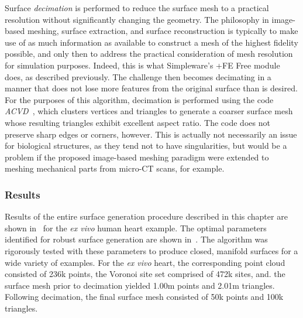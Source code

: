 Surface \textit{decimation} is performed to reduce the surface mesh to a practical resolution without significantly changing the geometry. The philosophy in image-based meshing, surface extraction, and surface reconstruction is typically to make use of as much information as available to construct a mesh of the highest fidelity possible, and only then to address the practical consideration of mesh resolution for simulation purposes. Indeed, this is what Simpleware's {+FE Free} module does, as described previously. The challenge then becomes decimating in a manner that does not lose more features from the original surface than is desired. For the purposes of this algorithm, decimation is performed using the code \textit{ACVD}~\cite{valette_2004, valette_2008}, which clusters vertices and triangles to generate a coarser surface mesh whose resulting triangles exhibit excellent aspect ratio. The code does not preserve sharp edges or corners, however. This is actually not necessarily an issue for biological structures, as they tend not to have singularities, but would be a problem if the proposed image-based meshing paradigm were extended to meshing mechanical parts from micro-CT scans, for example.

\subsubsection{Results}

Results of the entire surface generation procedure described in this chapter are shown in~ for the \textit{ex vivo} human heart example. The optimal parameters identified for robust surface generation are shown in~. The algorithm was rigorously tested with these parameters to produce closed, manifold surfaces for a wide variety of examples. For the \textit{ex vivo} heart, the corresponding point cloud consisted of 236k points, the Voronoi site set comprised of 472k sites, and. the surface mesh prior to decimation yielded 1.00m points and 2.01m triangles. Following decimation, the final surface mesh consisted of 50k points and 100k triangles.

